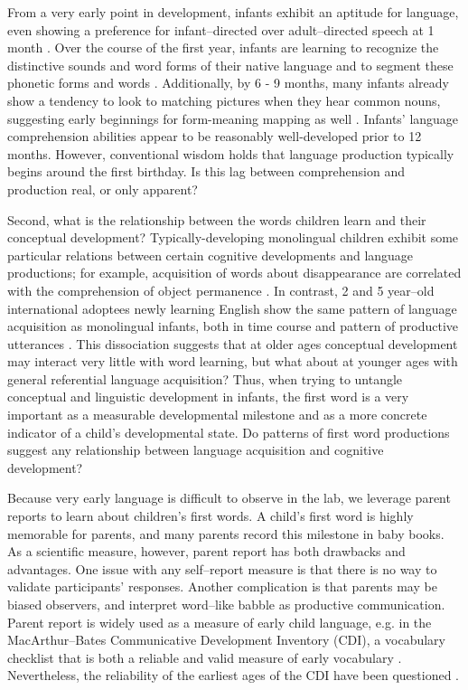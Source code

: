 \documentclass[10pt,letterpaper]{article}
\begin{document}
From a very early point in development, infants exhibit an aptitude for language, even showing a preference for infant--directed over adult--directed speech at 1 month \cite{cooper1990}.  Over the course of the first year, infants are learning to recognize the distinctive sounds and word forms of their native language \cite{kuhl2004} and to segment these phonetic forms and words \cite{werker2005}. Additionally, by 6 - 9  months, many infants already show a tendency to look to matching pictures when they hear common nouns, suggesting early beginnings for form-meaning mapping as well \cite{bergelson2012}. Infants' language comprehension abilities appear to be reasonably well-developed prior to 12 months. However, conventional wisdom holds that language production typically begins around the first birthday. Is this lag between comprehension and production real, or only apparent?

Second, what is the relationship between the words children learn and their conceptual development? Typically-developing monolingual children exhibit some particular relations between certain cognitive developments and language productions; for example, acquisition of words about disappearance are correlated with the comprehension of object permanence \cite{gopnik1986}.  In contrast, 2 and 5 year--old international adoptees newly learning English show the same pattern of language acquisition as monolingual infants, both in time course and pattern of productive utterances \cite{snedeker2005}. This dissociation suggests that at older ages conceptual development may interact very little with word learning, but what about at younger ages with general referential language acquisition? Thus, when trying to untangle conceptual and linguistic development in infants, the first word is a very important as a measurable developmental milestone and as a more concrete indicator of a child's developmental state.  Do patterns of first word productions suggest any relationship between language acquisition and cognitive development? 

Because very early language is difficult to observe in the lab, we leverage parent reports to learn about children's first words. A child's first word is highly memorable for parents, and many parents record this milestone in baby books. As a scientific measure, however, parent report has both drawbacks and advantages. One issue with any self--report measure is that there is no way to validate participants' responses. Another complication is that parents may be biased observers, and interpret word--like babble as productive communication. Parent report is widely used as a measure of early child language, e.g. in the MacArthur--Bates Communicative Development Inventory (CDI), a vocabulary checklist that is both a reliable and valid measure of early vocabulary \cite{fenson1994,fenson2007}. Nevertheless, the reliability of the earliest ages of the CDI have been questioned \cite{feldman2000}.
\end{document}
